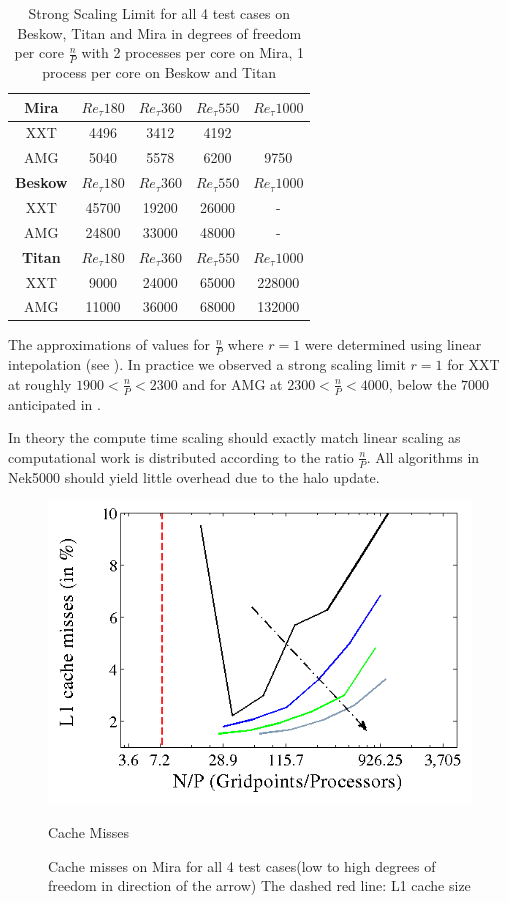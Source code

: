 \documentclass{sig-alternate}
\begin{document}
\begin{table}  
  \caption{Strong Scaling Limit for all 4 test cases on Beskow, Titan and Mira
  in degrees of freedom per core $\frac{n}{P}$ with 2 processes per core on Mira, 1 process per core on Beskow and Titan}
  \begin{tabular}{c||cccc}
    \hline
    \hline
    {\bf Mira}
    &$Re_{\tau} 180$&$Re_{\tau} 360$&$Re_{\tau} 550$&$Re_{\tau} 1000$\\
    \hline
    XXT&4496&3412&4192&\\
    AMG&5040&5578&6200&9750\\
    \hline
    \hline
    {\bf Beskow}
    &$Re_{\tau} 180$&$Re_{\tau} 360$&$Re_{\tau} 550$&$Re_{\tau} 1000$\\
    \hline
    XXT&45700&19200&26000& - \\
    AMG&24800&33000&48000& - \\
    \hline
    \hline
    {\bf Titan}
    &$Re_{\tau} 180$&$Re_{\tau} 360$&$Re_{\tau} 550$&$Re_{\tau} 1000$\\
    \hline
    XXT&9000&24000&65000&228000\\
    AMG&11000&36000&68000&132000\\
    \hline
    \hline
  \end{tabular}
  \label{tab:stronglimit}
\end{table}
The approximations of values for $\frac{n}{P}$ where
$r=1$ were determined using linear intepolation (see ).
 In practice we observed a strong scaling limit $r=1$ for XXT at roughly $1900<
\frac{n}{P} < 2300$ and for AMG at $2300<\frac{n}{P}<4000$, below the $7000$
anticipated in \cite{fischer:scaling}. 

In theory the compute time scaling should exactly match linear scaling
as computational work is distributed according to the ratio $\frac{n}{P}$. All
algorithms in Nek5000 should yield little overhead due to the halo update. 

\begin{figure}
  \centering
  \includegraphics[width=\linewidth]{./figures/cachelines.png}
  \caption{Cache Misses}
  \label{fig:cachemisses}
  \caption{Cache misses on Mira for all 4 test cases(low to high degrees of freedom in direction of the arrow) The dashed red line: L1 cache size}
\end{figure}
\end{document}
